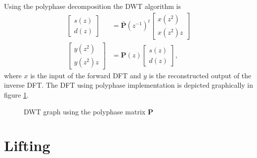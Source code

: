 \begin{refsection}
Using the polyphase decomposition the DWT algorithm is
\begin{align}
\begin{bmatrix}
	s(z) \\
	d(z)
\end{bmatrix}
&=
\bm{\bar P}(z^{-1})^t
\begin{bmatrix}
	x(z^2) \\     
	x(z^2) z
\end{bmatrix}
\\
\begin{bmatrix}
	y(z^2) \\
	y(z^2) z
\end{bmatrix}
&=
\bm P(z)
\begin{bmatrix}
	s(z) \\
	d(z)
\end{bmatrix}
,
\end{align}
where $x$ is the input of the forward DFT and $y$ is the reconstructed output of the inverse DFT.
The DFT using polyphase implementation is depicted graphically in figure \ref{fpga:fig:liftingSteps}.
\begin{figure}
	\centering
	
	\caption{DWT graph using the polyphase matrix $\bm P$}
	\label{fpga:fig:liftingSteps}
\end{figure}

\section{Lifting}


\end{refsection}
